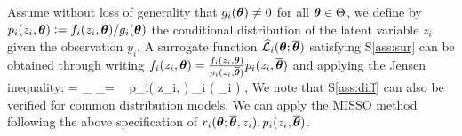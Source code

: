 \documentclass[11pt]{article}
\theoremstyle{t}
\begin{document}
Assume without loss of generality  that $g_i(\param) \neq 0$ for all $\param \in \Param$, we define by $p_i(z_i, \param) \eqdef f_i(z_i,\param)/g_i(\param)$ the conditional distribution of the latent variable $z_i$ given the observation $y_i$.
A surrogate function $\sur{i}{\param}{\op}$ satisfying S\ref{ass:sur} can be obtained through writing
$f_i(z_i,\param) = \frac{f_i(z_i,\param)}{p_i(z_i, \op)} p_i(z_i,\op)$ and applying the Jensen inequality:
\beq\label{pairmcem}
 = \int_{\Zset} _{=  } \!~ p_i( z_i, \op ) \mu_i ( \dz_i ) \eqsp,
\eeq
We note that S\ref{ass:diff} can also be verified for common distribution models.
We can apply the MISSO method following the above specification of $\rsur{i}{\param}{\op}{z_i}, p_i( z_i, \op )$.

\end{document}
